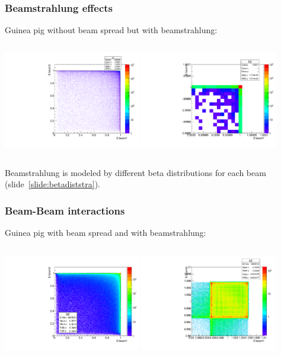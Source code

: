 \documentclass{beamer}
\begin{document}
\begin{frame}
\frametitle{Beamstrahlung effects}
Guinea pig \alert{without} beam spread but \alert{with} beamstrahlung:\\
\begin{columns}[c]
\column{6cm}
\includegraphics[width=6cm]{E1_E2_nospread_with_strahlung.pdf}
 \column{6cm}
\includegraphics[width=6cm]{E1_E2_nospread_strahlung_zoom.pdf}
\end{columns}
Beamstrahlung is modeled by different beta distributions for each beam
(slide~\ref{slide:betadiststra}).
\end{frame}

\begin{frame}
\frametitle{Beam-Beam interactions}
Guinea pig \alert{with} beam spread and \alert{with} beamstrahlung:\\
\begin{columns}[c]
\column{6cm}
\includegraphics[width=6cm]{E1_E2_spread_strahlung.pdf}
\column{6cm}
\includegraphics[width=6cm]{E1_E2_spread_strahlung_zoom.pdf}
\end{columns}
\end{frame}
\end{document}

